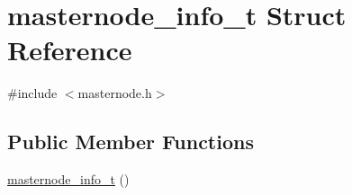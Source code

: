 \hypertarget{structmasternode__info__t}{}\section{masternode\+\_\+info\+\_\+t Struct Reference}
\label{structmasternode__info__t}


{\ttfamily \#include $<$masternode.\+h$>$}

\subsection*{Public Member Functions}
\begin{DoxyCompactItemize}
\item 
\mbox{\hyperlink{structmasternode__info__t_aae48a182910df4ceb63ec573c031d48b}{masternode\+\_\+info\+\_\+t}} ()
\end{DoxyCompactItemize}
